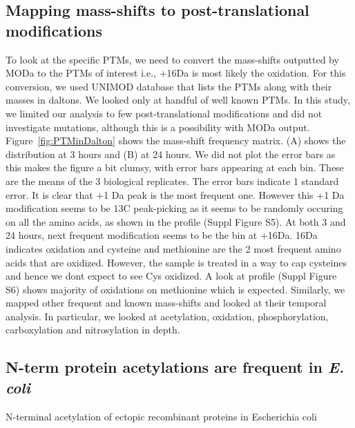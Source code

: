 \documentclass[12pt]{article}
\begin{document}
\subsection{Mapping mass-shifts to post-translational modifications}
To look at the specific PTMs, we need to convert the mass-shifts outputted by MODa to the PTMs of interest i.e., +16Da is most likely the oxidation. For this conversion, we used UNIMOD database that lists the PTMs along with their masses in daltons. We looked only at handful of well known PTMs. In this study, we limited our analysis to few post-translational modifications and did not investigate mutations, although this is a possibility with MODa output.
Figure~\ref{fig:PTMinDalton} shows the mass-shift frequency matrix. (A) shows the distribution at 3 hours and (B) at 24 hours. We did not plot the error bars as this makes the figure a bit clumsy, with error bars appearing at each bin. These are the means of the 3 biological replicates. The error bars indicate 1 standard error. It is clear that +1 Da peak is the most frequent one. However this +1 Da modification seems to be 13C peak-picking as it seems to be randomly occuring on all the amino acids, as shown in the profile (Suppl Figure S5). At both 3 and 24 hours, next frequent modification seems to be the bin at +16Da. 16Da indicates oxidation and cysteine and methionine are the 2 most frequent amino acids that are oxidized. However, the sample is treated in a way to cap cysteines and hence we dont expect to see Cys oxidized. A look at profile (Suppl Figure S6) shows majority of oxidations on methionine which is expected. Similarly, we mapped other frequent and known mass-shifts and looked at their temporal analysis. In particular, we looked at  acetylation, oxidation, phosphorylation, carboxylation and nitrosylation in depth.

\subsection{N-term protein acetylations are frequent in \emph{E. coli}}
\cite{Charbautetal2002}
{N-terminal acetylation of ectopic recombinant proteins in Escherichia coli}
\end{document}
